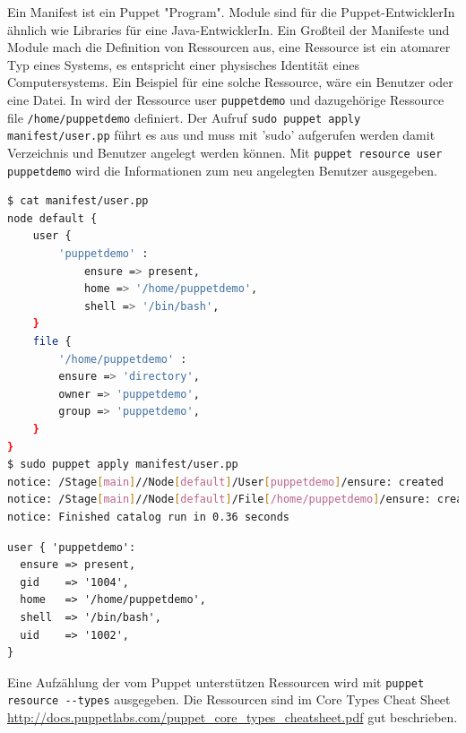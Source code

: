 \documentclass[12pt,a4paper,ngerman]{article}
\begin{document}
Ein Manifest ist ein Puppet "Program". Module sind für die Puppet-EntwicklerIn ähnlich wie Libraries für eine Java-EntwicklerIn. Ein Großteil der Manifeste und Module mach die Definition von Ressourcen aus, eine Ressource ist ein atomarer Typ eines Systems, es entspricht einer physisches Identität eines Computersystems. Ein Beispiel für eine solche Ressource, wäre ein Benutzer oder eine Datei. In  wird der Ressource user \lstinline$puppetdemo$ und dazugehörige Ressource file \lstinline$/home/puppetdemo$ definiert. Der Aufruf \lstinline$sudo puppet apply manifest/user.pp$ führt es aus und muss mit 'sudo' aufgerufen werden damit Verzeichnis und Benutzer angelegt werden können.
Mit \lstinline$puppet resource user puppetdemo$ wird die Informationen zum neu angelegten Benutzer ausgegeben.


\begin{lstlisting}[language=sh,caption=User mit Puppet anlegen, label=puppet-add-user]
$ cat manifest/user.pp 
node default {
    user {
        'puppetdemo' :
            ensure => present,
            home => '/home/puppetdemo',
            shell => '/bin/bash',
    }
    file {
        '/home/puppetdemo' :
        ensure => 'directory',
        owner => 'puppetdemo',
        group => 'puppetdemo',
    }
}
$ sudo puppet apply manifest/user.pp 
notice: /Stage[main]//Node[default]/User[puppetdemo]/ensure: created
notice: /Stage[main]//Node[default]/File[/home/puppetdemo]/ensure: created
notice: Finished catalog run in 0.36 seconds
\end{lstlisting}
\begin{lstlisting}[language=puppet,caption=Anzeige der Benutzerinformation in Puppet, label=puppet-add-user-info]
user { 'puppetdemo':
  ensure => present,
  gid    => '1004',
  home   => '/home/puppetdemo',
  shell  => '/bin/bash',
  uid    => '1002',
}
\end{lstlisting}

Eine Aufzählung der vom Puppet unterstützen Ressourcen wird mit \lstinline$puppet resource --types$ ausgegeben. Die Ressourcen sind im Core Types Cheat Sheet \url{http://docs.puppetlabs.com/puppet_core_types_cheatsheet.pdf} gut beschrieben.


\end{document}
